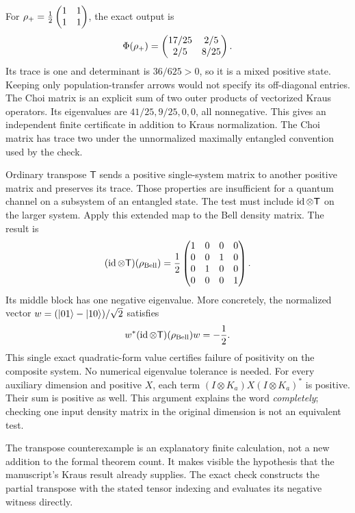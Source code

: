 For $\rho_+=\frac12\begin{pmatrix}1&1\\1&1\end{pmatrix}$, the exact output is
\[
\Phi(\rho_+)=\begin{pmatrix}17/25&2/5\\2/5&8/25\end{pmatrix}.
\]
Its trace is one and determinant is $36/625>0$, so it is a mixed positive state. Keeping only population-transfer arrows would not specify its off-diagonal entries.
The Choi matrix is an explicit sum of two outer products of vectorized Kraus operators. Its eigenvalues are $41/25,9/25,0,0$, all nonnegative. This gives an independent finite certificate in addition to Kraus normalization. The Choi matrix has trace two under the unnormalized maximally entangled convention used by the check.

Ordinary transpose $\mathsf T$ sends a positive single-system matrix to another positive matrix and preserves its trace. Those properties are insufficient for a quantum channel on a subsystem of an entangled state. The test must include $\operatorname{id}\otimes\mathsf T$ on the larger system.
Apply this extended map to the Bell density matrix. The result is
\[
(\operatorname{id}\otimes\mathsf T)(\rho_{\rm Bell})
=\frac12\begin{pmatrix}1&0&0&0\\0&0&1&0\\0&1&0&0\\0&0&0&1\end{pmatrix}.
\]
Its middle block has one negative eigenvalue. More concretely, the normalized vector $w=(\lvert 01\rangle-\lvert 10\rangle)/\sqrt2$ satisfies
\[
w^*(\operatorname{id}\otimes\mathsf T)(\rho_{\rm Bell})w=-\frac12.
\]
This single exact quadratic-form value certifies failure of positivity on the composite system. No numerical eigenvalue tolerance is needed.
For every auxiliary dimension and positive $X$, each term $(I\otimes K_a)X(I\otimes K_a)^*$ is positive. Their sum is positive as well. This argument explains the word \emph{completely}; checking one input density matrix in the original dimension is not an equivalent test.

The transpose counterexample is an explanatory finite calculation, not a new addition to the formal theorem count. It makes visible the hypothesis that the manuscript's Kraus result already supplies. The exact check constructs the partial transpose with the stated tensor indexing and evaluates its negative witness directly.

